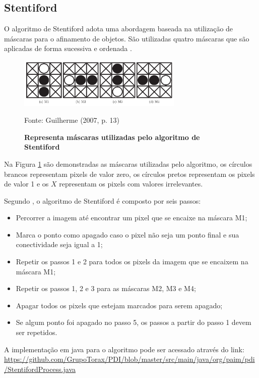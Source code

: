\documentclass[
	12pt,				%
	oneside,			%
	a4paper,			%
	english,			%
	french,				%
	spanish,			%
	brazil,				%
	]{abntex2}
\begin{document}
\subsection{Stentiford}    

O algoritmo de Stentiford adota uma abordagem baseada na utilização de máscaras para o afinamento de objetos. São utilizadas quatro máscaras que são aplicadas de forma sucessiva e ordenada \cite{guilherme:2007}.

\begin{figure}[ht]
\centering
\caption{\textbf{Representa máscaras utilizadas pelo algoritmo de Stentiford}}
\includegraphics[width=0.7\textwidth]{imagens/stentiford.png}

Fonte: Guilherme (2007, p. 13)
\label{fig:stentiford}
\end{figure}

Na Figura \ref{fig:stentiford} são demonstradas as máscaras utilizadas pelo algoritmo, os círculos brancos representam pixels de valor zero, os círculos pretos representam os pixels de valor 1 e os \(X\) representam os pixels com valores irrelevantes.

Segundo \citet{guilherme:2007}, o algoritmo de Stentiford é composto por seis passos:

\begin{itemize}
\item Percorrer a imagem até encontrar um pixel que se encaixe na máscara M1;
\item Marca o ponto como apagado caso o pixel não seja um ponto final e sua conectividade seja igual a 1;
\item Repetir os passos 1 e 2 para todos os pixels da imagem que se encaixem na máscara M1;
\item Repetir os passos 1, 2 e 3 para as máscaras M2, M3 e M4;
\item Apagar todos os pixels que estejam marcados para serem apagado;
\item Se algum ponto foi apagado no passo 5, os passos a partir do passo 1 devem ser repetidos.
\end{itemize}

A implementação em java para o algoritmo pode ser acessado através do link:
\url{https://github.com/GrupoTorax/PDI/blob/master/src/main/java/org/paim/pdi/StentifordProcess.java}
\end{document}
